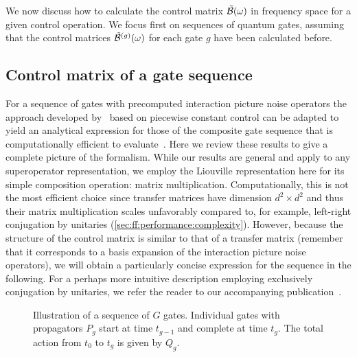 We now discuss how to calculate the control matrix $\tilde{\mathcal{B}}(\omega)$ in frequency space for a given control operation.
We focus first on sequences of quantum gates, assuming that the control matrices $\tilde{\mathcal{B}}^{(g)}(\omega)$ for each gate $g$ have been calculated before.

\subsection{Control matrix of a gate sequence}\label{subsec:ff:theory:control_matrix:sequence}
For a sequence of gates with precomputed interaction picture noise operators the approach developed by~\citet{Green2013} based on piecewise constant control can be adapted to yield an analytical expression for those of the composite gate sequence that is computationally efficient to evaluate~\cite{Cerfontaine2021}.
Here we review these results to give a complete picture of the formalism.
While our results are general and apply to any superoperator representation, we employ the Liouville representation here for its simple composition operation: matrix multiplication.
Computationally, this is not the most efficient choice since transfer matrices have dimension $d^2\times d^2$ and thus their matrix multiplication scales unfavorably compared to, for example, left-right conjugation by unitaries (\cf \cref{sec:ff:performance:complexity}).
However, because the structure of the control matrix \ctrlmat is similar to that of a transfer matrix (remember that it corresponds to a basis expansion of the interaction picture noise operators), we will obtain a particularly concise expression for the sequence in the following.
For a perhaps more intuitive description employing exclusively conjugation by unitaries, we refer the reader to our accompanying publication~.

\begin{figure}
    \centering
    
    \caption[Illustration of gate sequence]{
        Illustration of a sequence of $G$ gates.
        Individual gates with propagators $P_g$ start at time $t_{g-1}$ and complete at time $t_g$.
        The total action from $t_0$ to $t_g$ is given by $Q_g$.
    }
    \label{fig:ff:gatesequence}
\end{figure}

